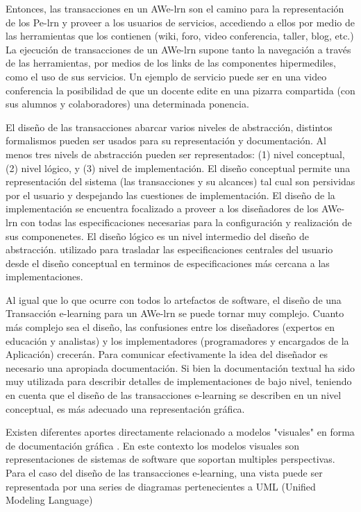 \documentclass[12 pt,a4paper]{llncs}
\begin{document}
Entonces, las transacciones en un AWe-lrn son el camino para la representación de los Pe-lrn y proveer a los usuarios de servicios, accediendo a ellos por medio de las herramientas que los contienen (wiki, foro, video conferencia, taller, blog, etc.) La ejecución de transacciones de un AWe-lrn supone tanto la navegación a través de las herramientas, por medios de los links de las componentes hipermediles, como  el uso de sus servicios. Un ejemplo de servicio puede ser en una video conferencia la posibilidad de que un docente edite en una pizarra compartida (con sus alumnos y colaboradores) una determinada ponencia. 

El diseño de las transacciones abarcar varios niveles de abstracción, distintos formalismos pueden ser usados para su representación y documentación. Al menos tres nivels de abstracción pueden ser representados: (1) nivel conceptual, (2) nivel lógico, y (3) nivel de implementación.  El diseño conceptual permite una representación del sistema (las transacciones y su alcances) tal cual son persividas por el usuario y despejando las cuestiones de implementación. El diseño de la implementación se encuentra focalizado a proveer a los diseñadores de los AWe-lrn con todas las especificaciones necesarias para la configuración y realización de sus componenetes. El diseño lógico es un nivel intermedio del diseño de abstracción. utilizado para  trasladar las especificaciones centrales del usuario desde el diseño conceptual en terminos de  especificaciones más cercana a las implementaciones.

Al igual que lo que ocurre con todos lo artefactos de software, el diseño de una Transacción e-learning para un AWe-lrn  se puede tornar muy complejo. Cuanto más complejo sea el diseño, las confusiones entre los diseñadores (expertos en educación y analistas) y los implementadores (programadores y  encargados de la Aplicación) crecerán. Para comunicar efectivamente la idea del diseñador es necesario una apropiada documentación. Si bien la documentación textual ha sido muy utilizada para describir detalles de implementaciones de bajo nivel, teniendo en cuenta que el diseño de las transacciones e-learning se describen en un  nivel conceptual, es más adecuado una representación gráfica. 

Existen diferentes aportes  directamente relacionado a modelos "visuales" en forma de documentación gráfica \cite{5,10,12}. En este contexto los modelos visuales son representaciones de sistemas de software que soportan multiples perspectivas. Para el caso del diseño de las transacciones e-learning, una vista puede ser representada por una series de diagramas pertenecientes a UML (Unified Modeling Language) \cite{UML} 
\end{document}
